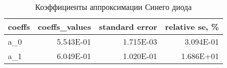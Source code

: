 \begin{table}[H]
\centering
\caption{Коэффициенты аппроксимации Синего диода}
\label{coeffs_table}
\begin{tabular}{lrrr}
\toprule
coeffs &  coeffs\_values &  standard error &  relative se, \% \\
\midrule
   a\_0 &      5.543E-01 &       1.715E-03 &       3.094E-01 \\
   a\_1 &      6.049E-01 &       1.020E-01 &       1.686E+01 \\
\bottomrule
\end{tabular}
\end{table}
